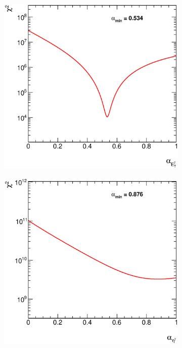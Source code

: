 \documentclass[12pt, twoside]{article}
\numberwithin{equation}{section}
\numberwithin{figure}{section}
\newenvironment{changemargin}[2]{%
\begin{list}{}{%
\setlength{\topsep}{0pt}%
\setlength{\leftmargin}{#1}%
\setlength{\rightmargin}{#2}%
\setlength{\listparindent}{\parindent}%
\setlength{\itemindent}{\parindent}%
\setlength{\parsep}{\parskip}%
}%
\item[]}{\end{list}}
\begin{document}
\begin{figure}[H]
    \checkoddpage
    \ifoddpage
        \begin{changemargin}{-0.5cm}{-0.0cm}
    \else
        \begin{changemargin}{-0.0cm}{-0.5cm}
    \fi
    \centering
        \begin{subfigure}[b]{0.33\textwidth}
            \includegraphics[width=\textwidth]{./images/ChiSquareTest/CHI2-101.eps}
            \subcaption{}
            \label{fig:ChiSquareEtPhoton}
        \end{subfigure}
        \begin{subfigure}[b]{0.33\textwidth}
            \includegraphics[width=\textwidth]{./images/ChiSquareTest/CHI2-102.eps}

\end{subfigure}
\end{changemargin}
\end{changemargin}
\end{figure}
\end{document}
